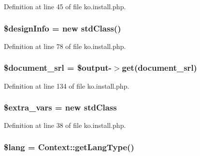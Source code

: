 Definition at line 45 of file ko.\+install.\+php.

\hypertarget{ko_8install_8php_a99e144f7d563ceb76b003d54739b3b0c}{}
\subsubsection[{\$design\+Info}]{\setlength{\rightskip}{0pt plus 5cm}\$design\+Info = new std\+Class()}\label{ko_8install_8php_a99e144f7d563ceb76b003d54739b3b0c}


Definition at line 78 of file ko.\+install.\+php.

\hypertarget{ko_8install_8php_a14522e7fff0604a8372c75b4a0fbc0fd}{}
\subsubsection[{\$document\+\_\+srl}]{\setlength{\rightskip}{0pt plus 5cm}\$document\+\_\+srl = \$output-\/$>$get(\textquotesingle{}document\+\_\+srl\textquotesingle{})}\label{ko_8install_8php_a14522e7fff0604a8372c75b4a0fbc0fd}


Definition at line 134 of file ko.\+install.\+php.

\hypertarget{ko_8install_8php_ae9f3d13d48d464400201d7ec024d3a45}{}
\subsubsection[{\$extra\+\_\+vars}]{\setlength{\rightskip}{0pt plus 5cm}\${\bf extra\+\_\+vars} = new std\+Class}\label{ko_8install_8php_ae9f3d13d48d464400201d7ec024d3a45}


Definition at line 38 of file ko.\+install.\+php.

\hypertarget{ko_8install_8php_a7714b111b644017933931ec69a154102}{}
\subsubsection[{\$lang}]{\setlength{\rightskip}{0pt plus 5cm}\$lang = {\bf Context\+::get\+Lang\+Type}()}\label{ko_8install_8php_a7714b111b644017933931ec69a154102}


